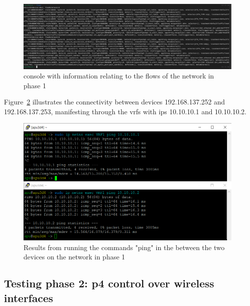 \begin{figure}
	\centering
	\includegraphics[width=\textwidth]{Chapters/Figures/tests/bmv2_phase_1/flows.PNG}
	\caption{ console with information relating to the flows of the network in phase 1}
	\label{fig:exp2_phase1_onos_flows}
\end{figure}

Figure~\ref{fig:exp2_phase1_pings} illustrates the connectivity between devices 192.168.137.252 and 192.168.137.253, manifesting through the \glspl{vrf} with \glspl{ip} 10.10.10.1 and 10.10.10.2.

\begin{figure}
	\centering
	\includegraphics[width=\textwidth]{Chapters/Figures/tests/bmv2_phase_1/pings-2.PNG}
	\caption{Results from running the commands "ping" in the  between the two devices on the network in phase 1}
	\label{fig:exp2_phase1_pings}
\end{figure}

\subsection[Testing phase 2: P4 control over wireless interfaces]{Testing phase 2: \gls{p4} control over wireless interfaces}

